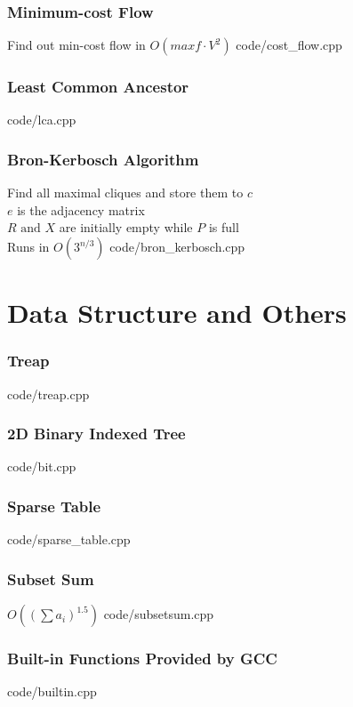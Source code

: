 \documentclass [landscape,8pt,a4paper,twocolumn]{article}
\begin{document}
\section{Minimum-cost Flow}
Find out min-cost flow in $ O(maxf \cdot V^2) $
 {code/cost_flow.cpp}

\section{Least Common Ancestor}

 {code/lca.cpp}

\vfill\null

\section{Bron-Kerbosch Algorithm}
Find all maximal cliques and store them to $ c $ \\
$ e $ is the adjacency matrix \\
$ R \text{ and } X $ are initially empty while $ P $ is full \\
Runs in $ O(3^{n/3}) $
 {code/bron_kerbosch.cpp}

\newpage
\part{Data Structure and Others}

\section{Treap}
 {code/treap.cpp}

\section{2D Binary Indexed Tree}
 {code/bit.cpp}

\section{Sparse Table}
 {code/sparse_table.cpp}

\section{Subset Sum}
$ O((\sum a_i)^{1.5}) $
 {code/subsetsum.cpp}

\section{Built-in Functions Provided by GCC}
 {code/builtin.cpp}
\end{document}
